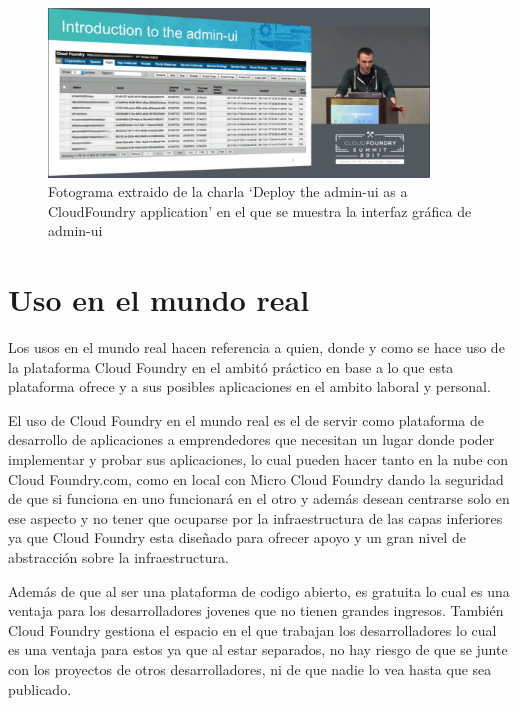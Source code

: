 \documentclass[a4paper,11pt]{article}
\begin{document}
\begin{figure}[h]
    \centering
    \includegraphics[width=0.9\textwidth]{fotogramaCharlaUI.png}
    \caption{Fotograma extraido de la charla `Deploy the admin-ui as a CloudFoundry application' en el que se muestra la interfaz gráfica de admin-ui}
    \label{fig:admin-ui}
\end{figure}


\section{Uso en el mundo real}

Los usos en el mundo real hacen referencia a quien, donde y como se hace uso de la plataforma Cloud Foundry en el ambitó práctico en base a lo que esta plataforma ofrece y a sus posibles aplicaciones en el ambito laboral y personal.

El uso de Cloud Foundry  en el mundo real es el de servir como plataforma de desarrollo de aplicaciones a emprendedores que necesitan un lugar donde poder implementar y probar sus aplicaciones, lo cual pueden hacer tanto en la nube con Cloud Foundry.com, como en local con Micro Cloud Foundry dando la seguridad de que si funciona en uno funcionará en el otro y además desean centrarse solo en ese aspecto y no tener que ocuparse por la infraestructura de las capas inferiores ya que Cloud Foundry esta diseñado para ofrecer apoyo y un gran nivel de abstracción sobre la infraestructura.

Además de que al ser una plataforma de codigo abierto, es gratuita lo cual es una ventaja para los desarrolladores jovenes que no tienen grandes ingresos. También Cloud Foundry gestiona el espacio en el que trabajan los desarrolladores lo cual es una ventaja para estos ya que al estar separados, no hay riesgo de que se junte con los proyectos de otros desarrolladores, ni de que nadie lo vea hasta que sea publicado.
\end{document}
